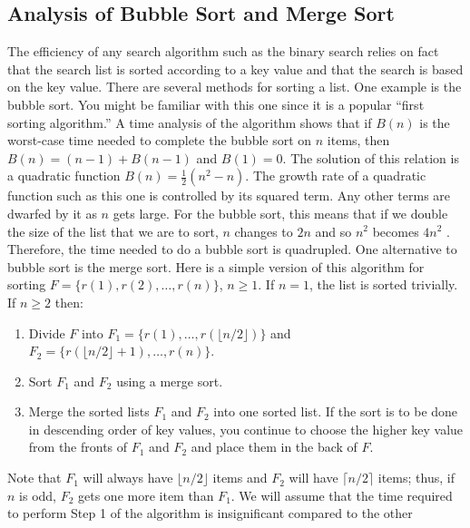 \documentclass[10pt,]{book}
\theoremstyle{plain}
\theoremstyle{definition}
\theoremstyle{definition}
\theoremstyle{definition}
\theoremstyle{definition}
\numberwithin{equation}{section}
\begin{document}
\subsection[Analysis of Bubble Sort and Merge Sort]{Analysis of Bubble Sort and Merge Sort}\label{ss-bubblesort-analysis}
 The efficiency of any search algorithm such as the binary search relies on fact that the search list is sorted according to a key value and that the search is based on the key value. There are several methods for sorting a list. One example is the bubble sort. You might
be familiar with this one since it is a popular ``first sorting algorithm.'' A time analysis of the algorithm shows that if \(B(n)\) is the worst-case
time needed to complete the bubble sort on \(n\) items, then \(B(n) =(n-1) + B(n-1)\) and \(B(1) = 0\). The solution of this relation is a
quadratic function \(B(n) =\frac{1}{2}\left(n^2-n\right)\). The growth rate of a quadratic function such as this one is controlled by its squared
term. Any other terms are dwarfed by it as \(n\) gets large. For the bubble sort, this means that if we double the size of the list that we
are to sort, \(n\) changes to \(2n\) and so \(n^2\) becomes \(4n^2\) . Therefore, the time needed to do a bubble sort is quadrupled. One alternative
to bubble sort is the merge sort. Here is a simple version of this algorithm for sorting \(F=\{r(1), r(2), \ldots , r(n)\}\), \(n \geq  1\). If \(n
= 1\), the list is sorted trivially. If \(n\geq  2\) then:%
\par
\leavevmode%
\begin{enumerate}[label=\arabic*]
\item\hypertarget{li-91}{} Divide \(F\) into \(F_1= \{r(1), \ldots , r(\lfloor n/2\rfloor )\}\) and \(F_2= \{r(\lfloor n/2\rfloor +1), \ldots ,r(n)\}\).%
\item\hypertarget{li-92}{}Sort \(F_1\) and \(F_2\) using a merge sort.%
\item\hypertarget{li-93}{}Merge the sorted lists \(F_1\) and \(F_2\) into one sorted list. If the sort is to be done in descending order of key values, you continue to choose the higher key value from the fronts of \(F_1\) and \(F_2\) and place them in the back of \(F\).%
\end{enumerate}
%
\par
Note that \(F_1\) will always have \(\lfloor n/2\rfloor\) items and \(F_2\) will have \(\lceil n/2\rceil\) items; thus, if \(n\) is odd, \(F_2\)
gets one more item than \(F_1\). We will assume that the time required to perform Step 1 of the algorithm is insignificant compared to the other
\end{document}
